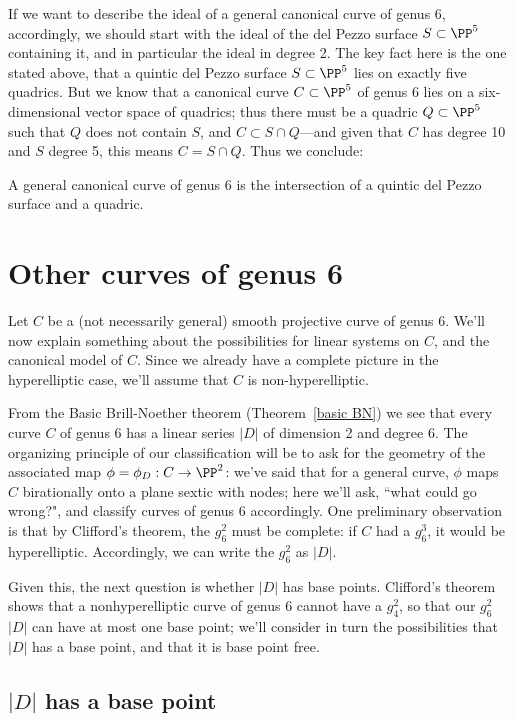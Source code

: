 If we want to describe the ideal of a general canonical curve of genus 6, accordingly, we should start with the ideal of the del Pezzo surface $S \subset \PP^5$ containing it, and in particular the ideal in degree 2. The key fact here is the one stated above, that a quintic del Pezzo surface $S \subset \PP^5$ lies on exactly five quadrics. But we know that a canonical curve $C \subset \PP^5$ of genus 6 lies on a six-dimensional vector space of quadrics; thus there must be a quadric $Q \subset \PP^5$ such that $Q$ does not contain $S$, and $C \subset S \cap Q$---and given that $C$ has degree 10 and $S$ degree 5, this means $C = S \cap Q$. Thus we conclude:

\begin{theorem}
A general canonical curve of genus 6 is the intersection of a quintic del Pezzo surface and a quadric. 
\end{theorem}

\section{Other curves of genus 6}

Let $C$ be a (not necessarily general) smooth projective curve of genus 6. We'll now explain something about the possibilities for  linear systems on $C$, and the canonical model of $C$. Since we already have a complete picture in the hyperelliptic case, we'll assume that $C$ is non-hyperelliptic.

From the Basic Brill-Noether theorem (Theorem~\ref{basic BN}) we see that every curve $C$ of genus 6 has a linear series $|D|$ of dimension 2
and degree 6. The organizing principle of our classification will be to ask for the geometry of the associated map $\phi = \phi_D : C \to \PP^2$: we've said that for a general curve,  $\phi$ maps $C$ birationally onto a plane sextic with nodes; here we'll ask, ``what could go wrong?", and classify curves of genus 6 accordingly. One preliminary observation is that by Clifford's theorem, the $g^2_6$ must be complete:  if $C$ had a $g^3_6$, it would be hyperelliptic. Accordingly, we can write the $g^2_6$ as $|D|$.

Given this, the next question is whether $|D|$ has base points.  Clifford's theorem shows that a nonhyperelliptic curve of genus 6 cannot have a $g^2_4$, so that our $g^2_6$ $|D|$ can have at most one base point; we'll consider in turn the possibilities that $|D|$ has a base point, and that it is base point free.

\subsection{$|D|$ has a base point}

